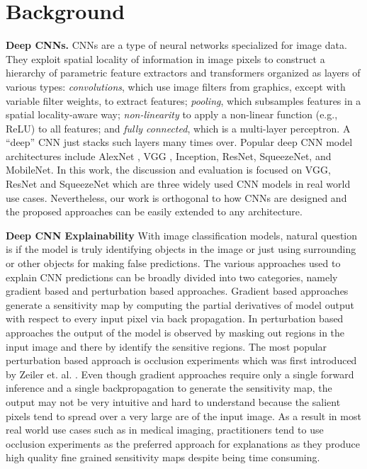 \section{Background}

\vspace{2mm}
\noindent \textbf{Deep CNNs.} CNNs are a type of neural networks specialized for image data.
They exploit spatial locality of information in image pixels to construct a hierarchy of parametric feature extractors and transformers organized as layers of various types: \textit{convolutions}, which use image
filters from graphics, except with variable filter weights, to extract features; \textit{pooling}, which subsamples features in a spatial
locality-aware way; \textit{non-linearity} to apply a non-linear
function (e.g., ReLU) to all features; and \textit{fully connected},
which is a multi-layer perceptron.
A ``deep'' CNN just stacks such layers many times over.
Popular deep CNN model architectures include AlexNet \cite{alexnet}, VGG \cite{vggnet}, Inception, ResNet, SqueezeNet, and MobileNet.
In this work, the discussion and evaluation is focused on VGG, ResNet and SqueezeNet which are three widely used CNN models in real world use cases.
Nevertheless, our work is orthogonal to how CNNs are designed and the proposed approaches can be easily extended to any architecture.

\vspace{2mm}
\noindent \textbf{Deep CNN Explainability} With image classification models, natural question is if the model is truly identifying objects in the image or just using surrounding or other objects for making false predictions.
The various approaches used to explain CNN predictions can be broadly divided into two categories, namely gradient based and perturbation based approaches. Gradient based approaches generate a sensitivity map by computing the partial derivatives of model output with respect to every input pixel via back propagation.
In perturbation based approaches the output of the model is observed by masking out regions in the input image and there by identify the sensitive regions. The most popular perturbation based approach is occlusion experiments which was first introduced by Zeiler et. al. \cite{zeiler2014visualizing}.
Even though gradient approaches require only a single forward inference and a single backpropagation to generate the sensitivity map, the output may not be very intuitive and hard to understand because the salient pixels tend to spread over a very large are of the input image.
As a result in most real world use cases such as in medical imaging, practitioners tend to use occlusion experiments as the preferred approach for explanations as they produce high quality fine grained sensitivity maps despite being time consuming.

